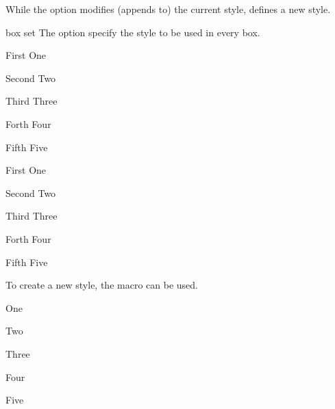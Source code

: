 \documentclass[a4paper, 11pt]{article}
\begin{document}
While the option  modifies (appends to) the current style,  defines a new style.

\begin{optiondef}{box set}{}{}
    The option  specify the style to be used in every box.

    \begin{example}{}
        \begin{PLTBoxRaster}[box set = {boxrule = 0pt, halign = center, sharp corners}]
            \item [First] One
            \item [Second] Two
            \item [Third] Three
            \item [Forth] Four
            \item [Fifth] Five
        \end{PLTBoxRaster}

        \begin{PLTBoxRaster}[box set = {colback = yellow}]
            \item [First] One
            \item [Second] Two
            \item [Third] Three
            \item [Forth] Four
            \item [Fifth] Five
        \end{PLTBoxRaster}
    \end{example}
\end{optiondef}

To create a new style, the macro  can be used.

\begin{example}{}

    \begin{PLTBoxRaster}[my item, roman, width = 0.8\linewidth]
        \item One
        \item Two
        \item Three
        \item Four
        \item Five
    \end{PLTBoxRaster}
\end{example}
\end{document}
